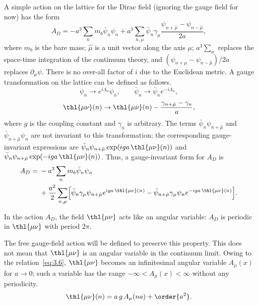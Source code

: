 A simple action on the lattice for the Dirac field (ignoring the gauge
field for now) has the form
\begin{equation}
A_{D} = -a^{3}\sum_{n} m_{b}\bar\psi_{n}\psi_{n}
        + a^{3}\sum_{n,\mu} \bar\psi_{n}\gamma_{\mu}
          \frac{\psi_{n+\hat\mu}-\psi_{n-\hat\mu}}{2a},
\label{eq:3.1}
\end{equation}
where $m_{b}$ is the bare mass; $\hat\mu$ is a unit vector along the axis
$\mu$; $a^{3}\sum_{n}$ replaces the space-time integration of the
continuum theory, and $(\psi_{n+\hat\mu}-\psi_{n-\hat\mu})/2a$ replaces
$\partial_{\mu}\psi$.  There is no over-all factor of $i$ due to the
Euclidean metric.  A gauge transformation on the lattice can be defined
as follows.
\begin{equation}
\psi_{n} \to e^{i\Lambda_{n}}\psi_{n},\qquad
\bar\psi_{n} \to \bar\psi_{n}e^{-i\Lambda_{n}},
\label{eq:3.2}
\end{equation}
\begin{equation}
\thl{\mu\nu}(n) \to \thl{\mu\nu}(n) - \frac{\gamma_{n+\hat\mu}-\gamma_{n}}{a},
\label{eq:3.3}
\end{equation}
where $g$ is the coupling constant and $\gamma_{n}$ is arbitrary.  The
terms $\bar\psi_{n}\psi_{n+\hat\mu}$ and $\bar\psi_{n+\hat\mu}\psi_{n}$
are not invariant to this transformation; the corresponding
gauge-invariant expressions are
$\bar\psi_{n}\psi_{n+\hat\mu}\exp(iga\,\thl{\mu\nu}(n))$ and
$\bar\psi_{n}\psi_{n+\hat\mu}\exp(-iga\,\thl{\mu\nu}(n))$.  Thus, a
gauge-invariant form for $A_{D}$ is
\begin{equation}
\begin{split}
A_{D} = {} & -a^{3}\sum_{n} m_{b}\bar\psi_{n}\psi_{n}\\
           & + \frac{a^{2}}{2}\sum_{n,\mu}
             \Bigl[\bar\psi_{n}\gamma_{\mu}\psi_{n+\hat\mu}
             e^{iga\,\thl{\mu\nu}(n)}
             -\bar\psi_{n+\hat\mu}\gamma_{\mu}\psi_{n}
             e^{-iga\,\thl{\mu\nu}(n)}\Bigr].
\end{split}
\label{eq:3.5}
\end{equation}

In the action $A_{D}$, the field $\thl{\mu\nu}$ acts like an angular
variable:  $A_{D}$ is periodic in $\thl{\mu\nu}$ with period $2\pi$.

The free gauge-field action will be defined to preserve this property.
This does not mean that $\thl{\mu\nu}$ is an angular variable in the
continuum limit.  Owing to the relation~\eqref{eq:3.6},
$\thl{\mu\nu}$ becomes an infinitesimal angular variable $A_{\mu}(x)$
for $a \to 0$; such a variable has the range
$-\infty < A_{\mu}(x) < \infty$ without any periodicity.
\begin{equation}
\thl{\mu\nu}(n) = a\,g\,A_{\mu}(na) + \order{a^{2}}.
\label{eq:3.6}
\end{equation}

